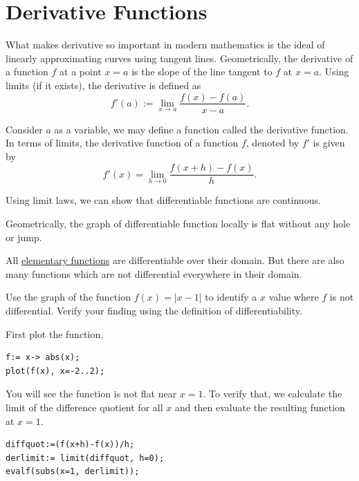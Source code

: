 \documentclass[
  en,11pt,simple]{elegantbook}
\renewenvironment{example}[1][]{
  \refstepcounter{exam}
  \par\noindent\textbf{\color{main}{\examplename} \theexam #1}
  \rmfamily
}{
  \par\ignorespacesafterend
}
\begin{document}
\hypertarget{derivative-functions}{%
\section{Derivative Functions}\label{derivative-functions}}

What makes derivative so important in modern mathematics is the ideal of linearly approximating curves using tangent lines. Geometrically, the derivative of a function \(f\) at a point \(x=a\) is the slope of the line tangent to \(f\) at \(x=a\). Using limits (if it exists), the derivative is defined as
\[
f'(a):=\lim\limits_{x\to a}\frac{f(x)-f(a)}{x-a}.
\]

Consider \(a\) as a variable, we may define a function called the derivative function. In terms of limits, the derivative function of a function \(f\), denoted by \(f'\) is given by
\[
f'(x)=\lim\limits_{h\to 0}\frac{f(x+h)-f(x)}{h}.
\]

Using limit laws, we can show that differentiable functions are continuous.

Geometrically, the graph of differentiable function locally is flat without any hole or jump.

All \href{https://en.wikipedia.org/wiki/Elementary_function}{elementary functions} are differentiable over their domain. But there are also many functions which are not differential everywhere in their domain.

\begin{example}

Use the graph of the function \(f(x)=|x-1|\) to identify a \(x\) value where \(f\) is not differential. Verify your finding using the definition of differentiability.
\end{example}

\begin{solution}
{}
First plot the function.

\begin{verbatim}
f:= x-> abs(x);
plot(f(x), x=-2..2);
\end{verbatim}

You will see the function is not flat near \(x=1\). To verify that, we calculate the limit of the difference quotient for all \(x\) and then evaluate the resulting function at \(x=1\).

\begin{verbatim}
diffquot:=(f(x+h)-f(x))/h;
derlimit:= limit(diffquot, h=0);
evalf(subs(x=1, derlimit));
\end{verbatim}
\end{solution}
\end{document}
